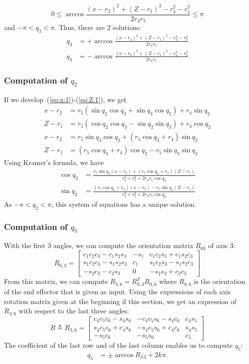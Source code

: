 \documentclass{article}
\begin{document}
$$
0 \leq \arccos \frac{(x-r_2)^2 + (Z-r_1)^2 - r_4^2 - r_5^2}{2r_4r_5} \leq \pi
$$
and $-\pi < q_3 < \pi$. Thus, there are 2 solutions:
\begin{align*}
  q_3 &= + \arccos \frac{(x-r_2)^2 + (Z-r_1)^2 - r_4^2 - r_5^2}{2r_4r_5}\\
  q_3 &= - \arccos \frac{(x-r_2)^2 + (Z-r_1)^2 - r_4^2 - r_5^2}{2r_4r_5}
\end{align*}
\subsubsection*{Computation of $q_2$}

If we develop~(\ref{eq:x:1})-(\ref{eq:Z:1}), we get
\begin{align*}
  x - r_2 &= r_5(\sin q_2 \cos q_3 + \sin q_3 \cos q_2) + r_4 \sin q_2 \\
  Z -r_1 &= r_5(\cos q_2 \cos q_3 - \sin q_2 \sin q_3) + r_4\cos q_2\\
  x - r_2 &= r_5\sin q_3 \cos q_2  + (r_5\cos q_3 + r_4)\sin q_2\\
  Z -r_1 &= (r_5\cos q_3 + r_4)\cos q_2 - r_5\sin q_3\sin q_2
\end{align*}
Using Kramer's formula, we have
\begin{align*}
  \cos q_2 &= \frac{r_5\sin q_3(x-r_2) + (r_5\cos q_3 + r_4)(Z-r_1)}{r_4^2 + r_5^2 + 2r_4r_5\cos q_3}\\
  \sin q_2 &= \frac{(r_5\cos q_3 + r_4)(x-r_2)-r_5\sin q_3(Z-r_1)}{r_4^2 + r_5^2 + 2r_4r_5\cos q_3}
\end{align*}
As $-\pi < q_2 < \pi$, this system of equations has a unique solution.

\subsubsection*{Computation of $q_5$}

With the first 3 angles, we can compute the orientation matrix $R_{03}$ of axis 3:
$$
R_{0,3} =
\begin{bmatrix}
  c_1c_2c_3 - c_1s_2s_3 & -s_1 & c_1c_2s_3 + c_1s_2c_3\\
  s_1c_2c_3 - s_1s_2s_3 & c_1  & s_1c_2s_3 - s_1s_2c_3 \\
  -s_2c_3-c_2s_3        & 0   & -s_2s_3 + c_2c_3
\end{bmatrix}
$$
From this matrix, we can compute $R_{3,6}=R_{0,3}^T R_{0,6}$ where $R_{0,6}$ is the orientation of the
end effector that is given as input. Using the expressions of each axis rotation matrix given at the beginning if this section, we get an expression of $R_{3,6}$ with respect to the last three angles:
$$
R \triangleq R_{3,6}=
\begin{bmatrix}
  c_4c_5c_6-s_4s_6 & -c_4c_5s_6-s_4c_6 & c_4s_5 \\
  s_4c_5c_6+c_4s_6 & -s_4c_5s_6+c_4c_6 & s_4s_5 \\
  -s_5c_6 & -s_5s_6 & c_5
\end{bmatrix}
$$
The coefficient of the last row and of the last column enables us to compute $q_5$:
\begin{align*}
  q_5 &= \pm \arccos R_{3\,3} + 2k\pi.
\end{align*}
\end{document}
